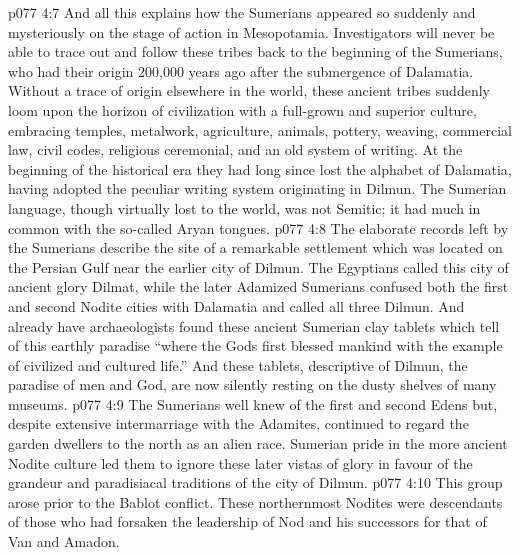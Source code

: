 \vs p077 4:7 And all this explains how the Sumerians appeared so suddenly and mysteriously on the stage of action in Mesopotamia. Investigators will never be able to trace out and follow these tribes back to the beginning of the Sumerians, who had their origin 200,000 years ago after the submergence of Dalamatia. Without a trace of origin elsewhere in the world, these ancient tribes suddenly loom upon the horizon of civilization with a full\hyp{}grown and superior culture, embracing temples, metalwork, agriculture, animals, pottery, weaving, commercial law, civil codes, religious ceremonial, and an old system of writing. At the beginning of the historical era they had long since lost the alphabet of Dalamatia, having adopted the peculiar writing system originating in Dilmun. The Sumerian language, though virtually lost to the world, was not Semitic; it had much in common with the so\hyp{}called Aryan tongues.
\vs p077 4:8 The elaborate records left by the Sumerians describe the site of a remarkable settlement which was located on the Persian Gulf near the earlier city of Dilmun. The Egyptians called this city of ancient glory Dilmat, while the later Adamized Sumerians confused both the first and second Nodite cities with Dalamatia and called all three Dilmun. And already have archaeologists found these ancient Sumerian clay tablets which tell of this earthly paradise “where the Gods first blessed mankind with the example of civilized and cultured life.” And these tablets, descriptive of Dilmun, the paradise of men and God, are now silently resting on the dusty shelves of many museums.
\vs p077 4:9 The Sumerians well knew of the first and second Edens but, despite extensive intermarriage with the Adamites, continued to regard the garden dwellers to the north as an alien race. Sumerian pride in the more ancient Nodite culture led them to ignore these later vistas of glory in favour of the grandeur and paradisiacal traditions of the city of Dilmun.
\vs p077 4:10 \bibnobreakspace {} This group arose prior to the Bablot conflict. These northernmost Nodites were descendants of those who had forsaken the leadership of Nod and his successors for that of Van and Amadon.
